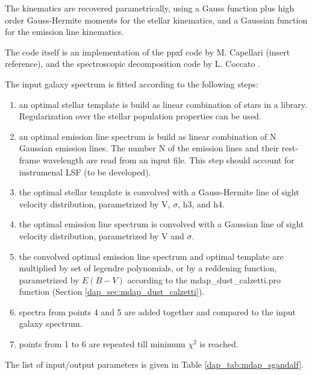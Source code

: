 \documentclass[11pt]{book}
\begin{document}
The kinematics are recovered parametrically, using a Gauss function
plus high order Gauss-Hermite moments for the stellar kinematics, and
a Gaussian function for the emission line kinematics.

The code itself is an implementation of the ppxf code by M. Capellari
(insert reference), and the spectroscopic decomposition code by
L. Coccato \citep{Coccato+11}.

The input galaxy spectrum is fitted according to the following steps:

\begin{enumerate}

  \item an optimal stellar template is build as linear combination of
    stars in a library. Regularization over the stellar population
    properties can be used.

  \item an optimal emission line spectrum is build as linear
    combination of N Gaussian emission lines. The number N of the
    emission lines and their rest-frame wavelength are read from an
    input file. This step should account for instrumenal LSF (to be
    developed).

  \item the optimal stellar template is convolved with a Gauss-Hermite
    line of sight velocity distribution, parametrized by V, $\sigma$,
    h3, and h4.

  \item the optimal emission line spectrum is convolved with a
    Gaussian line of sight velocity distribution, parametrized by V
    and $\sigma$.

  \item the convolved optimal emission line spectrum and optimal
    template are multiplied by set of legendre polynomials, or by a
    reddening function, parametrized by $E(B-V)$ according to the
    mdap\_dust\_calzetti.pro function (Section
    \ref{dap_sec:mdap_dust_calzetti}).

  \item spectra from points 4 and 5 are added together and compared to
    the input galaxy spectrum.

  \item points from 1 to 6 are repeated till minimum $\chi^2$ is
    reached.

\end{enumerate}

The list of input/output parameters is given in Table
\ref{dap_tab:mdap_sgandalf}.
\end{document}
